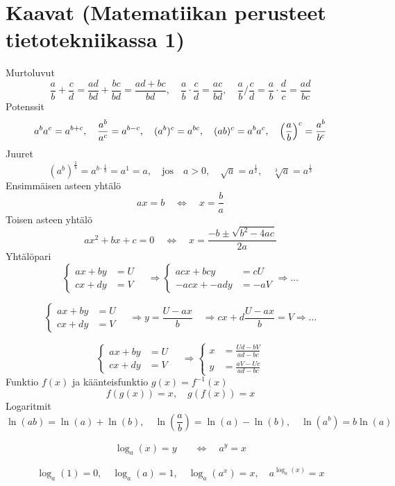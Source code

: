 \documentclass[12pt]{article}
\begin{document}
\section*{Kaavat (Matematiikan perusteet tietotekniikassa 1)}

Murtoluvut
$$
\frac{a}{b}+\frac{c}{d}=\frac{ad}{bd}+\frac{bc}{bd}
=\frac{ad+bc}{bd},\quad 
\frac{a}{b}\cdot\frac{c}{d}=\frac{ac}{bd},\quad
\frac{a}{b}\bigg/\frac{c}{d}=\frac{a}{b}\cdot\frac{d}{c}=\frac{ad}{bc}
$$
Potenssit
$$
a^ba^c=a^{b+c},\quad 
\frac{a^b}{a^c}=a^{b-c},\quad 
(a^b)^c=a^{bc},\quad 
(ab)^c=a^ba^c,\quad 
\left(\frac{a}{b}\right)^c=\frac{a^b}{b^c}
$$
Juuret
$$
(a^b)^{\frac{1}{b}}=a^{b\cdot \frac{1}{b}}=a^1=a,\quad\textrm{jos}\quad a>0,\quad 
\sqrt{a}=a^{\frac{1}{2}},\quad \sqrt[3]{a}=a^{\frac{1}{3}}
$$
Ensimmäisen asteen yhtälö
$$
ax=b\quad\Leftrightarrow\quad x=\frac{b}{a}
$$
Toisen asteen yhtälö
$$
ax^2+bx+c=0\quad\Leftrightarrow\quad x=\frac{-b\pm\sqrt{b^2-4ac}}{2a}
$$
Yhtälöpari
$$
\begin{cases}
ax+by&=U\\
cx+dy&=V
\end{cases}\quad\Rightarrow
\begin{cases}
acx+bcy&=cU\\
-acx+-ady&=-aV
\end{cases}\Rightarrow\ldots
$$

$$
\begin{cases}
ax+by&=U\\
cx+dy&=V
\end{cases}\quad\Rightarrow
y=\frac{U-ax}{b}\quad\Rightarrow
cx+d\frac{U-ax}{b}=V\Rightarrow\ldots
$$

$$
\begin{cases}
ax+by&=U\\
cx+dy&=V
\end{cases}\quad\Rightarrow
\begin{cases}
x&=\frac{Ud-bV}{ad-bc}\\
y&=\frac{aV-Uc}{ad-bc}
\end{cases}
$$
Funktio $f(x)$ ja käänteisfunktio $g(x)=f^{-1}(x)$
$$
f(g(x))=x,\quad
g(f(x))=x
$$
Logaritmit
$$
\ln(ab)=\ln(a)+\ln(b),\quad
\ln(\frac{a}{b})=\ln(a)-\ln(b),\quad
\ln(a^b)=b\ln(a)
$$


\begin{equation*}
\begin{split}
\log_a(x)=y\quad&\Leftrightarrow\quad a^y=x
\end{split}
\end{equation*}


$$
\log_a(1)=0,\quad
\log_a(a)=1,\quad
\log_a(a^x)=x,\quad
a^{\log_a(x)}=x
$$
\end{document}

